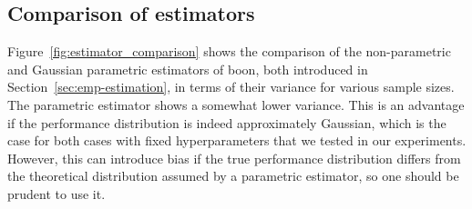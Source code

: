 \documentclass{article}
\newcommand{\tboon}{\gls{boon}\xspace}
\begin{document}
\begin{appendices}
\section{Comparison of estimators}




Figure~\ref{fig:estimator_comparison} shows the comparison of the non-parametric and Gaussian parametric estimators of \tboon, both introduced in Section~\ref{sec:emp-estimation}, in terms of their variance for various sample sizes. The parametric estimator shows a somewhat lower variance. This is an advantage if the performance distribution is indeed approximately Gaussian, which is the case for both cases with fixed hyperparameters that we tested in our experiments. However, this can introduce bias if the true performance distribution differs from the theoretical distribution assumed by a parametric estimator, so one should be prudent to use it.

\end{appendices}











\end{document}
